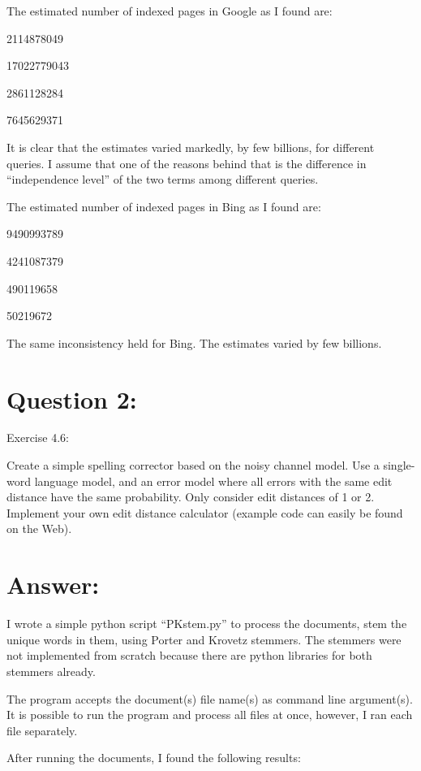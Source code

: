 \documentclass[a4paper, 11pt]{article}
\begin{document}
The estimated number of indexed pages in Google as I found are:

2114878049

17022779043

2861128284

7645629371

It is clear that the estimates varied markedly, by few billions, for different queries. I assume that one of the reasons behind that is the difference in ``independence level'' of the two terms among different queries.

The estimated number of indexed pages in Bing as I found are:

9490993789

4241087379

490119658

50219672

The same inconsistency held for Bing. The estimates varied by few billions.


\section*{Question 2:}
Exercise 4.6:

Create a simple spelling corrector based on the noisy channel model. Use a single-word language model, and an error model where all errors with the same edit distance have the same probability. Only consider edit distances of 1 or 2. Implement your own edit distance calculator (example code can easily be found on the Web).

\section*{Answer:}

I wrote a simple python script ``PKstem.py'' to process the documents, stem the unique words in them, using Porter and Krovetz stemmers. The stemmers were not implemented from scratch because there are python libraries for both stemmers already.

%

The program accepts the document(s) file name(s) as command line argument(s). It is possible to run the program and process all files at once, however, I ran each file separately.

After running the documents, I found the following results:
\end{document}
